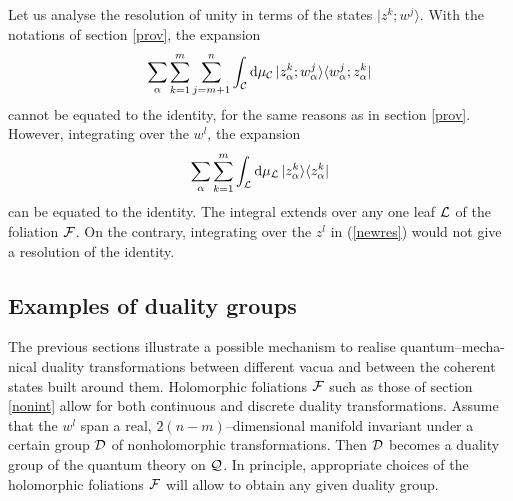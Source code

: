 \documentclass[a4paper,a4paper]{article}
\begin{document}
Let us analyse the resolution of unity in terms of the states
$|z^k;w^j\rangle$. With the notations of section \ref{prov}, the expansion
\begin{equation}
\sum_{\alpha}\sum_{k=1}^m\sum_{j=m+1}^n\int_{\cal C} {\rm d}\mu_{\cal C}\, 
|z^k_{\alpha};w^j_{\alpha}\rangle  \langle w^j_{\alpha};z^k_{\alpha}|
\label{newres}
\end{equation}
cannot be equated to the identity,
for the same reasons as in section \ref{prov}.
However, integrating over the $w^l$, the expansion
\begin{equation}
\sum_{\alpha}\sum_{k=1}^m\int_{\cal L} {\rm d}\mu_{\cal L}\, 
|z^k_{\alpha}\rangle  \langle z^k_{\alpha}|
\label{newresx}
\end{equation}
can be equated to the identity. The integral extends over any one leaf ${\cal L}$ 
of the foliation ${\cal F}$. On the contrary, integrating over the $z^l$ 
in (\ref{newres}) would not give a resolution of the identity.

\subsection{Examples of duality groups}\label{otros}

The previous sections illustrate a possible mechanism to realise quantum--mecha-nical 
duality transformations between different vacua and between the coherent states built 
around them. Holomorphic foliations ${\cal F}$ such as those of section \ref{nonint} 
allow for both continuous and discrete duality transformations. Assume that the $w^l$ span 
a real, $2(n-m)$--dimensional manifold invariant under a certain group ${\cal D}$ 
of nonholomorphic transformations. Then ${\cal D}$ becomes a duality group 
of the quantum theory on ${\cal Q}$. In principle, appropriate choices of the 
holomorphic foliations ${\cal F}$ will allow to obtain any given duality group. 
\end{document}
